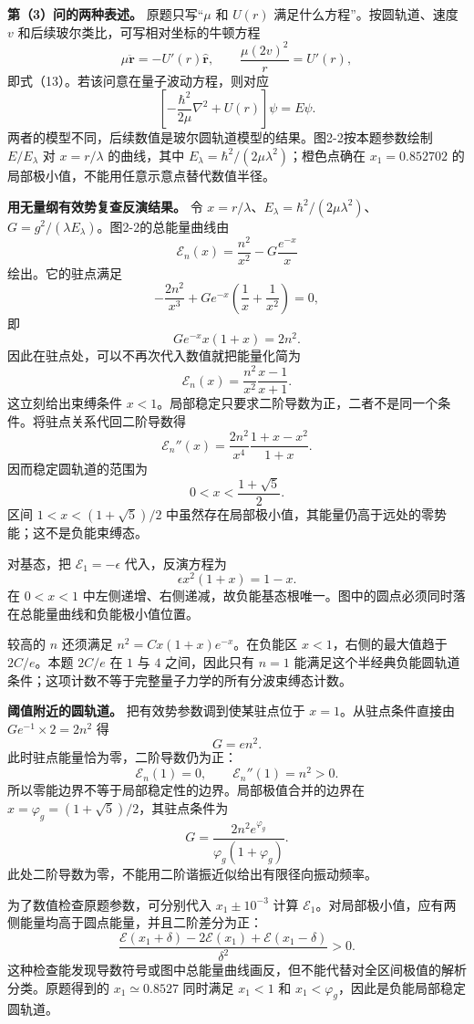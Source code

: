 \documentclass[12pt,a4paper,UTF8]{ctexart}
\begin{document}
\textbf{第（3）问的两种表述。} 原题只写``\(\mu\) 和 \(U(r)\)
满足什么方程''。按圆轨道、速度 \(v\)
和后续玻尔类比，可写相对坐标的牛顿方程 \[
\mu\ddot{\bm r}=-U'(r)\hat{\bm r},
\qquad \frac{\mu(2v)^2}{r}=U'(r),
\] 即式（13）。若该问意在量子波动方程，则对应 \[
\left[-\frac{\hbar^2}{2\mu}\nabla^2+U(r)\right]\psi=E\psi.
\] 两者的模型不同，后续数值是玻尔圆轨道模型的结果。图2-2按本题参数绘制
\(E/E_\lambda\) 对 \(x=r/\lambda\) 的曲线，其中
\(E_\lambda=\hbar^2/(2\mu\lambda^2)\)；橙色点确在 \(x_1=0.852702\)
的局部极小值，不能用任意示意点替代数值半径。

\textbf{用无量纲有效势复查反演结果。} 令
\(x=r/\lambda\)、\(E_\lambda=\hbar^2/(2\mu\lambda^2)\)、\(G=g^2/(\lambda E_\lambda)\)。图2-2的总能量曲线由
\[
\mathcal E_n(x)=\frac{n^2}{x^2}-G\frac{e^{-x}}x
\] 绘出。它的驻点满足 \[
-\frac{2n^2}{x^3}+G e^{-x}\left(\frac1x+\frac1{x^2}\right)=0,
\] 即 \[
G e^{-x}x(1+x)=2n^2.
\] 因此在驻点处，可以不再次代入数值就把能量化简为 \[
\mathcal E_n(x)=\frac{n^2}{x^2}\frac{x-1}{x+1}.
\] 这立刻给出束缚条件
\(x<1\)。局部稳定只要求二阶导数为正，二者不是同一个条件。将驻点关系代回二阶导数得
\[
\mathcal E_n''(x)=\frac{2n^2}{x^4}\frac{1+x-x^2}{1+x}.
\] 因而稳定圆轨道的范围为 \[
0<x<\frac{1+\sqrt5}{2}.
\] 区间 \(1<x<(1+\sqrt5)/2\)
中虽然存在局部极小值，其能量仍高于远处的零势能；这不是负能束缚态。

对基态，把 \(\mathcal E_1=-\epsilon\) 代入，反演方程为 \[
\epsilon x^2(1+x)=1-x.
\] 在 \(0<x<1\)
中左侧递增、右侧递减，故负能基态根唯一。图中的圆点必须同时落在总能量曲线和负能极小值位置。

较高的 \(n\) 还须满足 \(n^2=Cx(1+x)e^{-x}\)。在负能区
\(x<1\)，右侧的最大值趋于 \(2C/e\)。本题 \(2C/e\) 在 \(1\) 与 \(4\)
之间，因此只有 \(n=1\)
能满足这个半经典负能圆轨道条件；这项计数不等于完整量子力学的所有分波束缚态计数。

\textbf{阈值附近的圆轨道。} 把有效势参数调到使某驻点位于
\(x=1\)。从驻点条件直接由 \(G e^{-1}\times2=2n^2\) 得 \[
G=en^2.
\] 此时驻点能量恰为零，二阶导数仍为正： \[
\mathcal E_n(1)=0,
\qquad \mathcal E_n''(1)=n^2>0.
\] 所以零能边界不等于局部稳定性的边界。局部极值合并的边界在
\(x=\varphi_g=(1+\sqrt5)/2\)，其驻点条件为 \[
G=\frac{2n^2e^{\varphi_g}}{\varphi_g(1+\varphi_g)}.
\] 此处二阶导数为零，不能用二阶谐振近似给出有限径向振动频率。

为了数值检查原题参数，可分别代入 \(x_1\pm10^{-3}\) 计算
\(\mathcal E_1\)。对局部极小值，应有两侧能量均高于圆点能量，并且二阶差分为正：
\[
\frac{\mathcal E(x_1+\delta)-2\mathcal E(x_1)+\mathcal E(x_1-\delta)}{\delta^2}>0.
\]
这种检查能发现导数符号或图中总能量曲线画反，但不能代替对全区间极值的解析分类。原题得到的
\(x_1\simeq0.8527\) 同时满足 \(x_1<1\) 和
\(x_1<\varphi_g\)，因此是负能局部稳定圆轨道。
\end{document}
